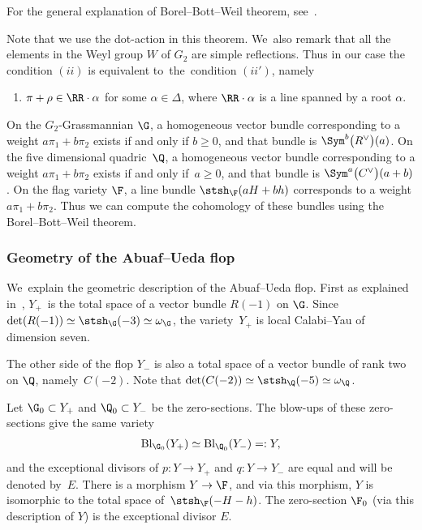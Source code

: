 For the general explanation of Borel--Bott--Weil theorem, see~\cite{Wey03}.

{\samepage
Note that we use the dot-action in this theorem.
We~also remark that all the elements in the Weyl group $W$ of $G_2$ are simple reflections.
Thus in our case the condition $(ii)$ is equivalent to~the~con\-dition $(ii')$, namely
\begin{enumerate}\itemsep=0pt
\item[$(ii')$] $\pi + \rho \in \RR \cdot \alpha$ for some $\alpha \in \Delta$, where $\RR \cdot \alpha$ is a line spanned by a root $\alpha$.
\end{enumerate}

}\noindent
On the $G_2$-Grassmannian $\G$, a homogeneous vector bundle corresponding to a weight $a \pi_1 + b \pi_2$ exists
if and only if $b \geq 0$, and that bundle is $\Sym^b\big(R^{\vee}\big)(a)$.
On the five dimensional quadric~$\Q$, a homogeneous vector bundle corresponding to a weight $a \pi_1 + b \pi_2$ exists
if and only if~$a \geq 0$, and that bundle is $\Sym^a\big(C^{\vee}\big)(a+b)$.
On the flag variety $\F$, a line bundle $\stsh_{\F}(aH+bh)$ corresponds to a weight $a \pi_1 + b \pi_2$.
Thus we can compute the cohomology of these bundles using the Borel--Bott--Weil theorem.


\subsubsection{Geometry of the Abuaf--Ueda flop}

We~explain the geometric description of the Abuaf--Ueda flop.
First as explained in~\cite{Ued16}, $Y_+$~is the total space of a vector bundle $R(-1)$ on $\G$.
Since $\det(R(-1)) \simeq \stsh_{\G}(-3) \simeq \omega_{\G}$, the variety~$Y_+$ is local Calabi--Yau of dimension seven.

The other side of the flop $Y_-$ is also a total space of a vector bundle of rank two on $\Q$,
namely~$C(-2)$.
Note that $\det(C(-2)) \simeq \stsh_{\Q}(-5) \simeq \omega_{\Q}$.

Let $\G_0 \subset Y_+$ and $\Q_0 \subset Y_-$ be the zero-sections.
The blow-ups of these zero-sections give the same variety
\begin{gather*}
\mathrm{Bl}_{\G_0}(Y_+) \simeq \mathrm{Bl}_{\Q_0}(Y_-) =: Y,
\end{gather*}
and the exceptional divisors of $p\colon Y \to Y_+$ and $q\colon Y \to Y_-$ are equal and will be denoted by~$E$.
There is a morphism $Y \to \F$, and via this morphism, $Y$ is isomorphic to the total space of~$\stsh_{\F}(-H-h)$.
The zero-section $\F_0$ (via this description of $Y$) is the exceptional divisor $E$.


